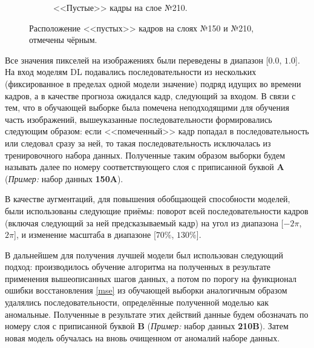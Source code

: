 \documentclass{article}
\begin{document}
\begin{figure}[H]
\begin{subfigure}{.47\textwidth}
            \caption{<<Пустые>> кадры на слое №210.}
        \end{subfigure}
        \caption{Расположение <<пустых>> кадров на слоях №150 и №210, отмечены чёрным.}\label{empties}
    \end{figure}

    Все значения пикселей на изображениях были переведены в диапазон [$0.0$, $1.0$]. На вход моделям DL подавались последовательности из нескольких (фиксированное в пределах одной модели значение) подряд идущих во времени кадров, а в качестве прогноза ожидался кадр, следующий за входом. В связи с тем, что в обучающей выборке была помечена неподходящими для обучения часть изображений, вышеуказанные последовательности формировались следующим образом: если <<помеченный>> кадр попадал в последовательность или следовал сразу за ней, то такая последовательность исключалась из тренировочного набора данных. Полученные таким образом выборки будем называть далее по номеру соответствующего слоя с приписанной буквой \textbf{A} (\textit{Пример:} набор данных \textbf{150A}).

    В качестве аугментаций, для повышения обобщающей способности моделей, были использованы следующие приёмы: поворот всей последовательности кадров (включая следующий за ней предсказываемый кадр) на угол из диапазона [$-2\pi$, $2\pi$], и изменение масштаба в диапазоне [$70\%$, $130\%$].

    В дальнейшем для получения лучшей модели был использован следующий подход: производилось обучение алгоритма на полученных в результате применения вышеописанных шагов данных, а потом по порогу на функционал ошибки восстановления \eqref{mse} из обучающей выборки аналогичным образом удалялись последовательности, определённые полученной моделью как аномальные. Полученные в результате этих действий данные будем обозначать по номеру слоя с приписанной буквой \textbf{B} (\textit{Пример:} набор данных \textbf{210B}). Затем новая модель обучалась на вновь очищенном от аномалий наборе данных.
    
\end{document}
